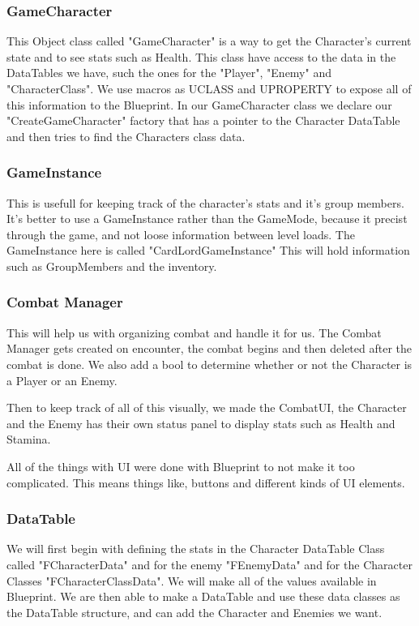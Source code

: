 \subsubsection{GameCharacter}
This Object class called "GameCharacter" is a way to get the Character's current state and to see stats such as Health. This class have access to the data in the DataTables we have, such the ones for the "Player", "Enemy" and "CharacterClass". We use macros as UCLASS and UPROPERTY to expose all of this information to the Blueprint. In our GameCharacter class we declare our "CreateGameCharacter" factory that has a pointer to the Character DataTable and then tries to find the Characters class data.

\subsubsection{GameInstance}
This is usefull for keeping track of the character's stats and it's group members. It's better to use a GameInstance rather than the GameMode, because it precist through the game, and not loose information between level loads. The GameInstance here is called "CardLordGameInstance" This will hold information such as GroupMembers and the inventory.

\subsubsection{Combat Manager}
This will help us with organizing combat and handle it for us. The Combat Manager gets created on encounter, the combat begins and then deleted after the combat is done. We also add a bool to determine whether or not the Character is a Player or an Enemy.

Then to keep track of all of this visually, we made the CombatUI, the Character and the Enemy has their own status panel to display stats such as Health and Stamina.

All of the things with UI were done with Blueprint to not make it too complicated. This means things like, buttons and different kinds of UI elements.


\subsubsection{DataTable}
We will first begin with defining the stats in the Character DataTable Class called "FCharacterData" and for the enemy "FEnemyData" and for the Character Classes "FCharacterClassData". We will make all of the values available in Blueprint. We are then able to make a DataTable and use these data classes as the DataTable structure, and can add the Character and Enemies we want.


